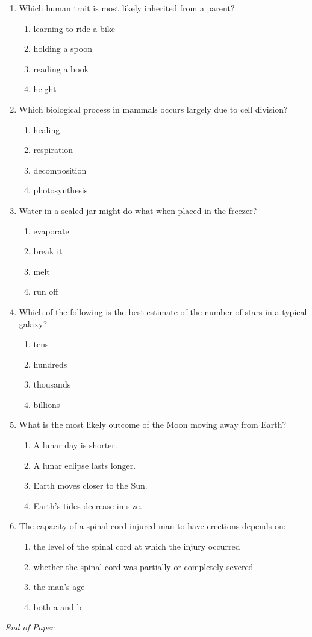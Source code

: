 \documentclass[12pt]{article}
\begin{document}
\begin{enumerate}[label=\arabic*.]
\begin{enumerate}[label=(\alph*)]
    \item 30
\end{enumerate}
\item Which human trait is most likely inherited from a parent?
\begin{enumerate}[label=(\alph*)]
    \item learning to ride a bike
    \item holding a spoon
    \item reading a book
    \item height
\end{enumerate}
\item Which biological process in mammals occurs largely due to cell division?
\begin{enumerate}[label=(\alph*)]
    \item healing
    \item respiration
    \item decomposition
    \item photosynthesis
\end{enumerate}
\item Water in a sealed jar might do what when placed in the freezer?
\begin{enumerate}[label=(\alph*)]
    \item evaporate
    \item break it
    \item melt
    \item run off
\end{enumerate}
\item Which of the following is the best estimate of the number of stars in a typical galaxy?
\begin{enumerate}[label=(\alph*)]
    \item tens
    \item hundreds
    \item thousands
    \item billions
\end{enumerate}
\item What is the most likely outcome of the Moon moving away from Earth?
\begin{enumerate}[label=(\alph*)]
    \item A lunar day is shorter.
    \item A lunar eclipse lasts longer.
    \item Earth moves closer to the Sun.
    \item Earth's tides decrease in size.
\end{enumerate}
\item The capacity of a spinal-cord injured man to have erections depends on:
\begin{enumerate}[label=(\alph*)]
    \item the level of the spinal cord at which the injury occurred
    \item whether the spinal cord was partially or completely severed
    \item the man's age
    \item both a and b
\end{enumerate}
\end{enumerate}

\vfill
\noindent\textit{End of Paper}
\end{document}
